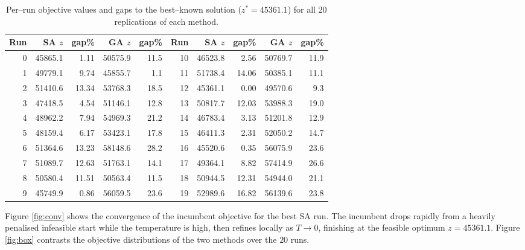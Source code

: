 \documentclass [a4paper, 11pt, titlepage] {article}
\begin{document}
\begin{table}[!htb]
  \footnotesize
  \centering
  \begin{tabular}{|r|r|r|r|r||r|r|r|r|r|}
    \hline
    Run & SA $z$ & gap\% & GA $z$ & gap\% & Run & SA $z$ & gap\% & GA $z$ & gap\% \\
    \hline
    0 & 45865.1 & 1.11  & 50575.9 & 11.5 & 10 & 46523.8 & 2.56  & 50769.7 & 11.9 \\
    1 & 49779.1 & 9.74  & 45855.7 & 1.1  & 11 & 51738.4 & 14.06 & 50385.1 & 11.1 \\
    2 & 51410.6 & 13.34 & 53768.3 & 18.5 & 12 & 45361.1 & 0.00  & 49570.6 & 9.3  \\
    3 & 47418.5 & 4.54  & 51146.1 & 12.8 & 13 & 50817.7 & 12.03 & 53988.3 & 19.0 \\
    4 & 48962.2 & 7.94  & 54969.3 & 21.2 & 14 & 46783.4 & 3.13  & 51201.8 & 12.9 \\
    5 & 48159.4 & 6.17  & 53423.1 & 17.8 & 15 & 46411.3 & 2.31  & 52050.2 & 14.7 \\
    6 & 51364.6 & 13.23 & 58148.6 & 28.2 & 16 & 45520.6 & 0.35  & 56075.9 & 23.6 \\
    7 & 51089.7 & 12.63 & 51763.1 & 14.1 & 17 & 49364.1 & 8.82  & 57414.9 & 26.6 \\
    8 & 50580.4 & 11.51 & 50563.4 & 11.5 & 18 & 50944.5 & 12.31 & 54944.0 & 21.1 \\
    9 & 45749.9 & 0.86  & 56059.5 & 23.6 & 19 & 52989.6 & 16.82 & 56139.6 & 23.8 \\
    \hline
  \end{tabular}
  \caption{Per--run objective values and gaps to the best--known solution
  ($z^{*}=45361.1$) for all 20 replications of each method.}
  \label{tab:perrun}
\end{table}

Figure \ref{fig:conv} shows the convergence of the incumbent objective for the
best SA run. The incumbent drops rapidly from a heavily penalised infeasible
start while the temperature is high, then refines locally as $T \to 0$,
finishing at the feasible optimum $z=45361.1$. Figure \ref{fig:box} contrasts
the objective distributions of the two methods over the $20$ runs.
\end{document}
